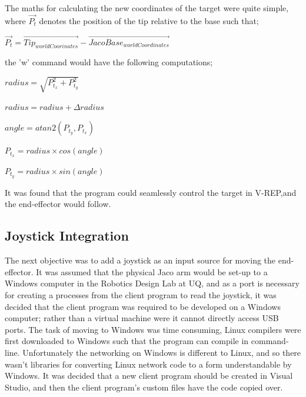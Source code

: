 \documentclass[12pt,openany,a4paper]{book}
\begin{document}
\vspace{\baselineskip}
The maths for calculating the new coordinates of the target were quite simple, where $\vec{P_t}$ denotes the position of the tip relative to the base such that;

\vspace{\baselineskip}
$\vec{P_t} = \vec{Tip_{worldCoorinates}} - \vec{JacoBase_{worldCoordinates}}$

\vspace{\baselineskip}
the 'w' command would have the following computations;

\vspace{\baselineskip}
$radius = \sqrt{P_{t_x}^2 + P_{t_y}^2}$

\vspace{\baselineskip}
$radius = radius + \Delta radius$

\vspace{\baselineskip}
$angle = atan2(P_{t_y}, P_{t_x})$

\vspace{\baselineskip}
$P_{t_x} = radius \times cos(angle)$

\vspace{\baselineskip}
$P_{t_y} = radius \times sin(angle)$

\vspace{\baselineskip}
It was found that the program could seamlessly control the target in V-REP,and the end-effector would follow.

\subsection{Joystick Integration}
The next objective was to add a joystick as an input source for moving the end-effector. It was assumed that the physical Jaco arm would be set-up to a Windows computer in the Robotics Design Lab at UQ, and as a port is necessary for creating a processes from the client program to read the joystick, it was decided that the client program was required to be developed on a Windows computer; rather than a virtual machine were it cannot directly access USB ports. The task of moving to Windows was time consuming, Linux compilers were first downloaded to Windows such that the program can compile in command-line. Unfortunately the networking on Windows is different to Linux, and so there wasn't libraries for converting Linux network code to a form understandable by Windows. It was decided that a new client program should be created in Visual Studio, and then the client program's custom files have the code copied over.
\end{document}
